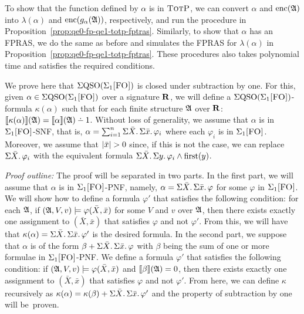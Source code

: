 To show that the function defined by $\alpha$ is in $\text{\sc TotP}$, we can convert $\alpha$ and ${\rm enc}(\mathfrak{A})$ into $\lambda(\alpha)$ and ${\rm enc}(g_{\alpha}(\mathfrak{A}))$, respectively, and run the procedure in Proposition~\ref{prop:qe0-fp-qe1-totp-fptras}. Similarly, to show that $\alpha$ has an FPRAS, we do the same as before and simulates the FPRAS for $\lambda(\alpha)$ in Proposition~\ref{prop:qe0-fp-qe1-totp-fptras}. These procedures also takes polynomial time and satisfies the required conditions.

\medskip


 We prove here that $\Sigma{\rm QSO}(\Sigma_{1}\textsc{[FO]})$ is closed under subtraction by one. 
For this, given $\alpha \in \Sigma{\rm QSO}(\Sigma_{1}\textsc{[FO]})$ over a signature $\mathbf{R}$, we will define a $\Sigma{\rm QSO}(\Sigma_{1}\textsc{[FO]})$-formula $\kappa(\alpha)$ such that for each finite structure $\mathfrak{A}$ over $\mathbf{R}$: $\sem{\kappa(\alpha)}(\A) = \sem{\alpha}(\A) \dotminus 1$. 
Without loss of generality, we assume that $\alpha$ is in $\Sigma_{1}\textsc{[FO]}$-SNF, that is, $\alpha = \sum_{i = 1}^{n}\Sigma{\bar{X}}.\,\Sigma{\bar{x}}.\,\varphi_i$ where each $\varphi_i$ is in $\Sigma_{1}\textsc{[FO]}$. Moreover, we assume that $\vert \bar{x} \vert > 0$  since, if this is not the case, we can replace $\Sigma{\bar{X}}.\,\varphi_i$ with the equivalent formula $\Sigma{\bar{X}}.\, \Sigma{y}.\, \varphi_i \wedge\operatorname{first}(y)$.

{\em Proof outline:} The proof will be separated in two parts. In the first part, we will assume that  $\alpha$ is in $\Sigma_{1}\textsc{[FO]}$-PNF, namely, $\alpha = \Sigma{\bar{X}}.\,\Sigma{\bar{x}}.\,\varphi$ for some $\varphi$ in $\Sigma_{1}\textsc{[FO]}$. We will show how to define a formula $\varphi'$ that satisfies the following condition: for each $\mathfrak{A}$, if $(\mathfrak{A},V,v)\models \varphi(\bar{X},\bar{x})$ for some $V$ and $v$ over $\mathfrak{A}$, then there exists exactly one assignment to $(\bar{X},\bar{x})$ that satisfies $\varphi$ and not $\varphi'$. 
From this, we will have that $\kappa(\alpha) = \Sigma{\bar{X}}.\,\Sigma{\bar{x}}.\,\varphi'$ is the desired formula. In the second part, we suppose that $\alpha$ is of the form $\beta + \Sigma{\bar{X}}.\,\Sigma{\bar{x}}.\,\varphi$ with $\beta$ being the sum of one or more formulae in $\Sigma_{1}\textsc{[FO]}$-PNF. 
We define a formula $\varphi'$ that satisfies the following condition: if $(\mathfrak{A},V,v)\models \varphi(\bar{X},\bar{x})$ and ${\llbracket{}{\beta}\rrbracket}(\mathfrak{A}) = 0$, then there exists exactly one assignment to $(\bar{X},\bar{x})$ that satisfies $\varphi$ and not $\varphi'$. From here, we can define $\kappa$ recursively as  $\kappa(\alpha) = \kappa(\beta) +  \Sigma{\bar{X}}.\,\Sigma{\bar{x}}.\,\varphi'$ and the property of subtraction by one will be~proven.

